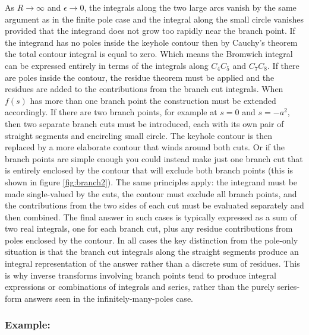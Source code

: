 As $R \to \infty$ and $\epsilon \to 0$, the integrals along the two large arcs vanish by the same argument as in the finite pole case and the integral along the small circle vanishes provided that the integrand does not grow too rapidly near the branch point. If the integrand has no poles inside the keyhole contour then by Cauchy's theorem the total contour integral is equal to zero. Which means the Bromwich integral can be expressed entirely in terms of the integrals along $C_4C_5$ and $C_7C_8$. If there are poles inside the contour, the residue theorem must be applied and the residues are added to the contributions from the branch cut integrals. When $f(s)$ has more than one branch point the construction must be extended accordingly. If there are two branch points, for example at $s = 0$ and $s = -a^2$, then two separate branch cuts must be introduced, each with its own pair of straight segments and encircling small circle. The keyhole contour is then replaced by a more elaborate contour that winds around both cuts. Or if the branch points are simple enough you could instead make just one branch cut that is entirely enclosed by the contour that will exclude both branch points (this is shown in figure \ref{fig:branch2}). The same principles apply: the integrand must be made single-valued by the cuts, the contour must exclude all branch points, and the contributions from the two sides of each cut must be evaluated separately and then combined. The final answer in such cases is typically expressed as a sum of two real integrals, one for each branch cut, plus any residue contributions from poles enclosed by the contour. In all cases the key distinction from the pole-only situation is that the branch cut integrals along the straight segments produce an integral representation of the answer rather than a discrete sum of residues. This is why inverse transforms involving branch points tend to produce integral expressions or combinations of integrals and series, rather than the purely series-form answers seen in the infinitely-many-poles case.


\subsubsection{Example:}


